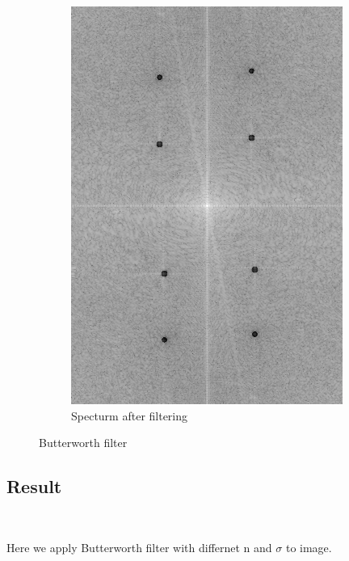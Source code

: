 \documentclass[
	12pt, %
]{style/fphw}
\begin{document}
\begin{figure}[H]
\begin{subfigure}[b]{.3\textwidth}
         \includegraphics[width=\textwidth]{plots2/Q5_3_spectrum_filtered_1_30.png}
         \caption{Specturm after filtering}
         \label{Q5_3_spectrum_filtered_1_30}
     \end{subfigure}
    \caption{Butterworth filter}
    \label{Butterworth filter}
\end{figure}

\subsection*{Result} \

Here we apply Butterworth filter with differnet n and $\sigma$ to image.
\end{document}
